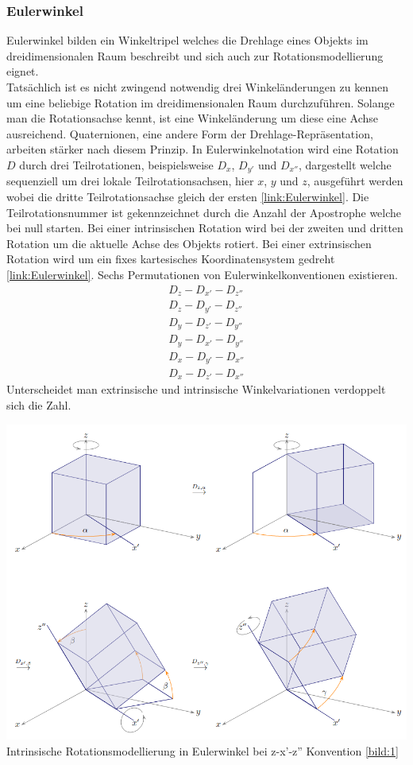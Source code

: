 \subsubsection{Eulerwinkel}
Eulerwinkel bilden ein Winkeltripel welches die Drehlage eines Objekts im dreidimensionalen Raum beschreibt und sich auch zur Rotationsmodellierung eignet.\\
Tatsächlich ist es nicht zwingend notwendig drei Winkeländerungen zu kennen um eine beliebige Rotation im dreidimensionalen Raum durchzuführen. Solange man die Rotationsachse kennt, ist eine Winkeländerung um diese eine Achse ausreichend. Quaternionen, eine andere Form der Drehlage-Repräsentation, arbeiten stärker nach diesem Prinzip. In Eulerwinkelnotation wird eine Rotation $D$ durch drei Teilrotationen, beispielsweise $D_x$, $D_{y'}$ und $D_{x''}$, dargestellt welche sequenziell um drei lokale Teilrotationsachsen, hier $x$, $y$ und $z$, ausgeführt werden wobei die dritte Teilrotationsachse gleich der ersten \ref{link:Eulerwinkel}. Die Teilrotationsnummer ist gekennzeichnet durch die Anzahl der Apostrophe welche bei null starten.
Bei einer intrinsischen Rotation wird bei der zweiten und dritten Rotation um die aktuelle Achse des Objekts rotiert. Bei einer extrinsischen Rotation wird um ein fixes kartesisches Koordinatensystem gedreht \ref{link:Eulerwinkel}.
Sechs Permutationen von Eulerwinkelkonventionen existieren.
\begin{align}
	D_z-D_{x'}-D_{z''}\\
	D_z-D_{y'}-D_{z''}\\
	D_y-D_{z'}-D_{y''}\\
	D_y-D_{x'}-D_{y''}\\
	D_x-D_{y'}-D_{x''}\\
	D_x-D_{z'}-D_{x''}
\end{align}
Unterscheidet man extrinsische und intrinsische Winkelvariationen verdoppelt sich die Zahl.
\begin{center}
	\includegraphics[scale=0.5]{../images/0026 Eulerwinkel.png}{\\Intrinsische Rotationsmodellierung in Eulerwinkel bei z-x'-z'' Konvention \ref{bild:1}}
\end{center}
